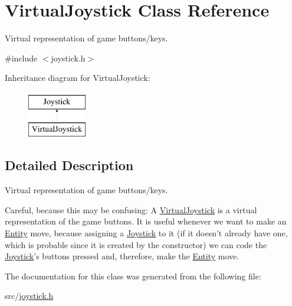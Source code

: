 \hypertarget{class_virtual_joystick}{\section{Virtual\-Joystick Class Reference}
\label{class_virtual_joystick}
}


Virtual representation of game buttons/keys.  




{\ttfamily \#include $<$joystick.\-h$>$}

Inheritance diagram for Virtual\-Joystick\-:\begin{figure}[H]
\begin{center}
\leavevmode
\includegraphics[height=2.000000cm]{class_virtual_joystick}
\end{center}
\end{figure}


\subsection{Detailed Description}
Virtual representation of game buttons/keys. 

Careful, because this may be confusing\-: A \hyperlink{class_virtual_joystick}{Virtual\-Joystick} is a virtual representation of the game buttons. It is useful whenever we want to make an \hyperlink{class_entity}{Entity} move, because assigning a \hyperlink{class_joystick}{Joystick} to it (if it doesn't already have one, which is probable since it is created by the constructor) we can code the \hyperlink{class_joystick}{Joystick}'s buttons pressed and, therefore, make the \hyperlink{class_entity}{Entity} move. 

The documentation for this class was generated from the following file\-:\begin{DoxyCompactItemize}
\item 
src/\hyperlink{joystick_8h}{joystick.\-h}\end{DoxyCompactItemize}
